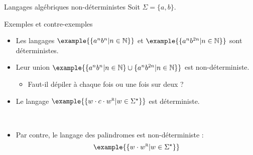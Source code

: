 
\begingroup

\begin{frame}{Langages algébriques non-déterministes}
  Soit $\Sigma = \{a, b\}$.
  
  \begin{exampleblock}{Exemples et contre-exemples}
    \begin{itemize}
    \item Les langages $\example{\{ a^n b^n | n\in \mathbb{N}\}}$ et $\example{\{ a^n b^{2n} | n\in \mathbb{N}\}}$ sont déterministes.
    \item\vspace{2mm} Leur union $\example{\{ a^n b^n | n\in \mathbb{N}\} \cup \{ a^n b^{2n} | n\in \mathbb{N}\}}$ est non-déterministe.
      \begin{itemize}
      \item Faut-il dépiler à chaque fois ou une fois sur deux ? 
      \end{itemize}
    \item\vspace{2mm} Le langage $\example{\{ w \cdot c \cdot w^{\textsc{r}} | w\in \Sigma^\star\}}$ est déterministe.
      \begin{center}
        \\
      \end{center}
    \item\vspace{2mm} Par contre, le langage des palindromes est non-déterministe :
      $$\example{\{ w \cdot w^{\textsc{r}} | w\in \Sigma^\star\}}$$
    \end{itemize}
  \end{exampleblock}
\end{frame}

\endgroup
